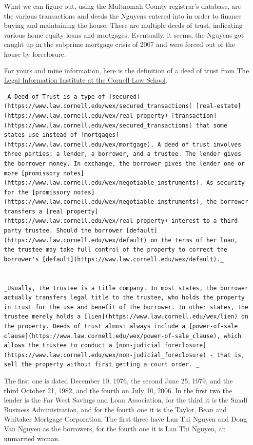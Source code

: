 \documentclass[
  12pt,
]{book}
\begin{document}
What we can figure out, using the Multnomah County registrar's database, are the various transactions and deeds the Nguyens entered into in order to finance buying and maintaining the house. There are multiple deeds of trust, indicating various home equity loans and mortgages. Eventually, it seems, the Nguyens got caught up in the subprime mortgage crisis of 2007 and were forced out of the house by foreclosure.

For yours and mine information, here is the definition of a deed of trust from The \href{https://www.law.cornell.edu/wex/deed_of_trust}{Legal Information Institute at the Cornell Law School}.

\begin{verbatim}
_A Deed of Trust is a type of [secured](https://www.law.cornell.edu/wex/secured_transactions) [real-estate](https://www.law.cornell.edu/wex/real_property) [transaction](https://www.law.cornell.edu/wex/secured_transactions) that some states use instead of [mortgages](https://www.law.cornell.edu/wex/mortgage). A deed of trust involves three parties: a lender, a borrower, and a trustee. The lender gives the borrower money. In exchange, the borrower gives the lender one or more [promissory notes](https://www.law.cornell.edu/wex/negotiable_instruments). As security for the [promissory notes](https://www.law.cornell.edu/wex/negotiable_instruments), the borrower transfers a [real property](https://www.law.cornell.edu/wex/real_property) interest to a third-party trustee. Should the borrower [default](https://www.law.cornell.edu/wex/default) on the terms of her loan, the trustee may take full control of the property to correct the borrower's [default](https://www.law.cornell.edu/wex/default)._


_Usually, the trustee is a title company. In most states, the borrower actually transfers legal title to the trustee, who holds the property in trust for the use and benefit of the borrower. In other states, the trustee merely holds a [lien](https://www.law.cornell.edu/wex/lien) on the property. Deeds of trust almost always include a [power-of-sale clause](https://www.law.cornell.edu/wex/power-of-sale_clause), which allows the trustee to conduct a [non-judicial foreclosure](https://www.law.cornell.edu/wex/non-judicial_foreclosure) - that is, sell the property without first getting a court order. _
\end{verbatim}

The first one is dated December 10, 1976, the second June 25, 1979, and the third October 21, 1982, and the fourth on July 10, 2006. In the first two the lender is the Far West Savings and Loan Association, for the third it is the Small Business Administration, and for the fourth one it is the Taylor, Bean and Whitaker Mortgage Corporation. The first three have Lan Thi Nguyen and Dong Van Nguyen as the borrowers, for the fourth one it is Lan Thi Nguyen, an unmarried woman.
\end{document}

